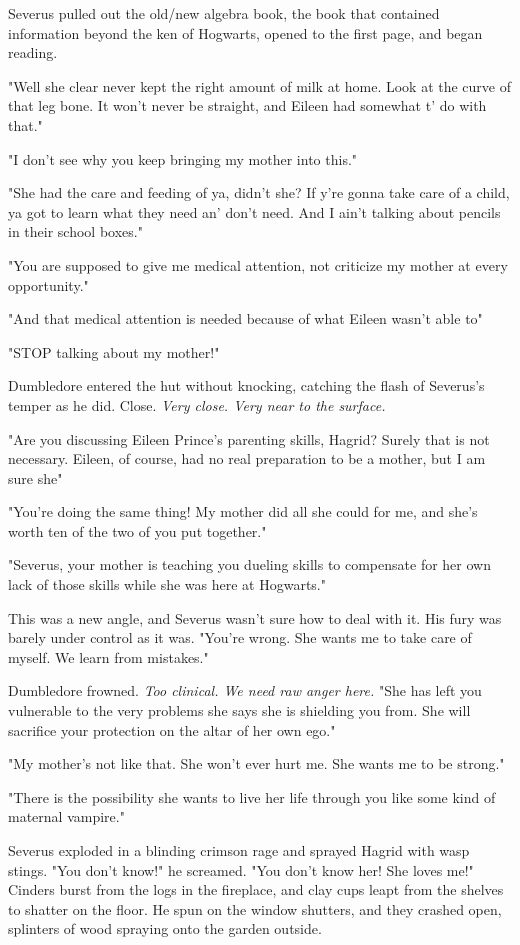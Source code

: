 Severus pulled out the old\slash new algebra book, the book that contained information beyond the ken of Hogwarts, opened to the first page, and began reading.

"Well she clear never kept the right amount of milk at home. Look at the curve of that leg bone. It won't never be straight, and Eileen had somewhat t' do with that."

"I don't see why you keep bringing my mother into this."

"She had the care and feeding of ya, didn't she? If y're gonna take care of a child, ya got to learn what they need an' don't need. And I ain't talking about pencils in their school boxes."

"You are supposed to give me medical attention, not criticize my mother at every opportunity."

"And that medical attention is needed because of what Eileen wasn't able to{\el}"

"STOP talking about my mother!"

Dumbledore entered the hut without knocking, catching the flash of Severus's temper as he did. Close. \emph{Very close. Very near to the surface.}

"Are you discussing Eileen Prince's parenting skills, Hagrid? Surely that is not necessary. Eileen, of course, had no real preparation to be a mother, but I am sure she{\el}"

"You're doing the same thing! My mother did all she could for me, and she's worth ten of the two of you put together."

"Severus, your mother is teaching you dueling skills to compensate for her own lack of those skills while she was here at Hogwarts."

This was a new angle, and Severus wasn't sure how to deal with it. His fury was barely under control as it was. "You're wrong. She wants me to take care of myself. We learn from mistakes."

Dumbledore frowned. \emph{Too clinical. We need raw anger here.} "She has left you vulnerable to the very problems she says she is shielding you from. She will sacrifice your protection on the altar of her own ego."

"My mother's{\el} not{\el} like that. She won't{\el} ever{\el} hurt me. She wants me{\el} to be strong."

"There is the possibility she wants to live her life through you like some kind of maternal vampire."

Severus exploded in a blinding crimson rage and sprayed Hagrid with wasp stings. "You don't know!" he screamed. "You don't know her! She loves me!" Cinders burst from the logs in the fireplace, and clay cups leapt from the shelves to shatter on the floor. He spun on the window shutters, and they crashed open, splinters of wood spraying onto the garden outside.

